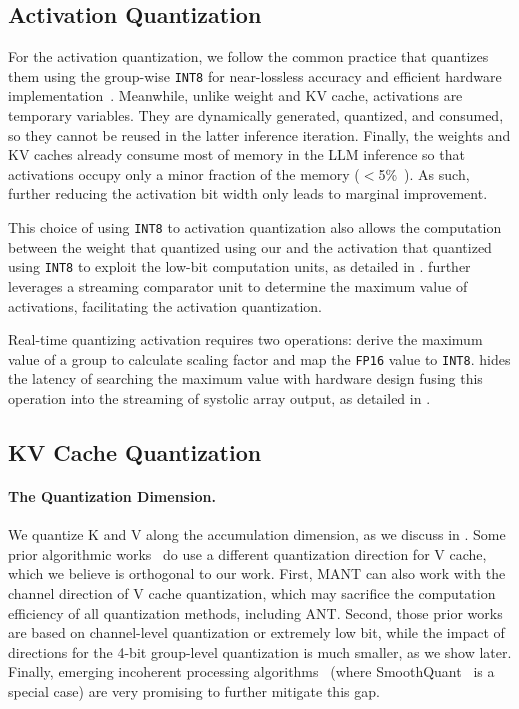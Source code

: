 \subsection{Activation Quantization}
\label{sec:dse_act}

For the activation quantization, we follow the common practice that quantizes them using the group-wise \texttt{INT8} for near-lossless accuracy and efficient hardware implementation~\cite{frantar2023gptq,lin2023awq, kim2023squeezellm}.
Meanwhile, unlike weight and KV cache, activations are temporary variables.
They are dynamically generated, quantized, and consumed, so they cannot be reused in the latter inference iteration.
Finally, the weights and KV caches already consume most of memory in the LLM inference so that activations occupy only a minor fraction of the memory ($<$5\%~\cite{yuan2024llm}).
As such, further reducing the activation bit width only leads to marginal improvement.

 

This choice of using \texttt{INT8} to activation quantization also allows the computation between the weight that quantized using our \proj{} and the activation that quantized using \texttt{INT8} to exploit the low-bit computation units, as detailed in \mbox{}.
\proj further leverages a streaming comparator unit to determine the maximum value of activations, facilitating the activation quantization.

Real-time quantizing activation requires two operations: derive the maximum value of a group to calculate scaling factor and map the \texttt{FP16} value to \texttt{INT8}.
\proj hides the latency of searching the maximum value with hardware design fusing this operation into the streaming of systolic array output, as detailed in .



\subsection{KV Cache Quantization}
\label{sec:dse_kv}


\paragraph{The Quantization Dimension.}
We quantize K and V along the accumulation dimension, as we discuss in .
Some prior algorithmic works~\cite{liu2024kivi,hooper2024kvquant} do use a different quantization direction for V cache, which we believe is orthogonal to our work. 
First, MANT can also work with the channel direction of V cache quantization, which may sacrifice the computation efficiency of all quantization methods, including ANT. 
Second, those prior works are based on channel-level quantization or extremely low bit, while the impact of directions for the 4-bit group-level quantization is much smaller, as we show later. 
Finally, emerging incoherent processing algorithms~\cite{ashkboos2024quarot,tseng2024quipbetterllmquantization,xiao2023smoothquant} (where SmoothQuant~\cite{xiao2023smoothquant} is a special case) are very promising to further mitigate this gap.

